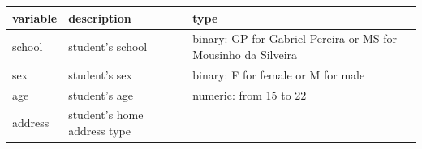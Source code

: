 \documentclass[]{article}
\begin{document}
\begin{longtable}[]{@{}lll@{}}
\toprule
\begin{minipage}[b]{0.05\columnwidth}\raggedright
variable\strut
\end{minipage} & \begin{minipage}[b]{0.28\columnwidth}\raggedright
description\strut
\end{minipage} & \begin{minipage}[b]{0.58\columnwidth}\raggedright
type\strut
\end{minipage}\tabularnewline
\midrule
\endhead
\begin{minipage}[t]{0.05\columnwidth}\raggedright
school\strut
\end{minipage} & \begin{minipage}[t]{0.28\columnwidth}\raggedright
student's school\strut
\end{minipage} & \begin{minipage}[t]{0.58\columnwidth}\raggedright
binary: GP for Gabriel Pereira or MS for Mousinho da Silveira\strut
\end{minipage}\tabularnewline
\begin{minipage}[t]{0.05\columnwidth}\raggedright
sex\strut
\end{minipage} & \begin{minipage}[t]{0.28\columnwidth}\raggedright
student's sex\strut
\end{minipage} & \begin{minipage}[t]{0.58\columnwidth}\raggedright
binary: F for female or M for male\strut
\end{minipage}\tabularnewline
\begin{minipage}[t]{0.05\columnwidth}\raggedright
age\strut
\end{minipage} & \begin{minipage}[t]{0.28\columnwidth}\raggedright
student's age\strut
\end{minipage} & \begin{minipage}[t]{0.58\columnwidth}\raggedright
numeric: from 15 to 22\strut
\end{minipage}\tabularnewline
\begin{minipage}[t]{0.05\columnwidth}\raggedright
address\strut
\end{minipage} & \begin{minipage}[t]{0.28\columnwidth}\raggedright
student's home address type\strut
\end{minipage} & \begin{minipage}[t]{0.58\columnwidth}\raggedright

\end{minipage}
\end{longtable}
\end{document}

